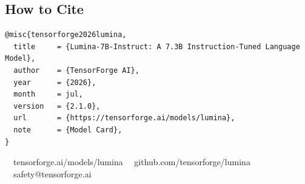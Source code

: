 \documentclass[11pt,a4paper]{article}
\begin{document}
\vspace{2pt}

\subsection*{How to Cite}

\begin{lstlisting}[caption={BibTeX citation.}]
@misc{tensorforge2026lumina,
  title     = {Lumina-7B-Instruct: A 7.3B Instruction-Tuned Language Model},
  author    = {TensorForge AI},
  year      = {2026},
  month     = jul,
  version   = {2.1.0},
  url       = {https://tensorforge.ai/models/lumina},
  note      = {Model Card},
}
\end{lstlisting}

\vspace{4pt}
{\small\color{medium}\faGlobe~~tensorforge.ai/models/lumina\qquad
\faGithub~~github.com/tensorforge/lumina\qquad
\faEnvelope~~safety@tensorforge.ai}
\end{document}
